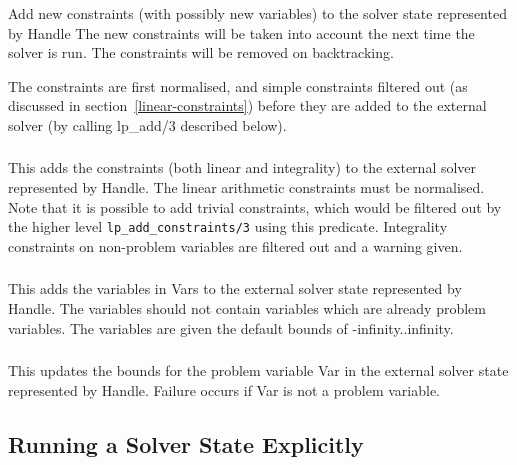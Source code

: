 Add new constraints (with possibly new variables) to the solver state
represented by Handle
The new constraints will be taken into account the next time the
solver is run.  The constraints will be removed on backtracking.

The constraints are first normalised, and simple constraints filtered out (as
discussed in section~\ref{linear-constraints}) before they are added
to the external solver (by calling lp_add/3 described below).

\subsubsection{}
\label{lp-add}

This adds the constraints (both linear and integrality) to the
external solver represented by Handle. The linear arithmetic constraints
must be normalised. Note that it is possible to add trivial constraints,
which would be filtered out by the higher level {\tt lp_add_constraints/3}
using this predicate. Integrality constraints on non-problem variables are
filtered out and a warning given.

\subsubsection{}

This adds the variables in Vars to the external solver state represented by
Handle. The variables should not contain variables which are already
problem variables. The variables are given the default bounds of
-infinity..infinity. 

\subsubsection{}

This updates the bounds for the problem variable Var in the external
solver state represented by Handle. Failure occurs if Var is not a problem
variable. 

\subsection{Running a Solver State Explicitly}


